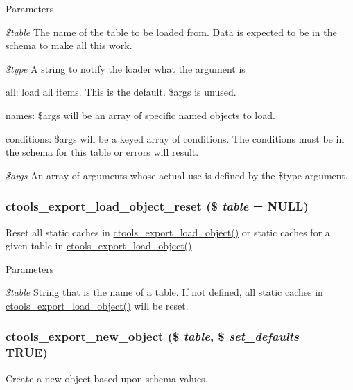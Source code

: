 \begin{DoxyParams}{Parameters}
\item[{\em \$table}]The name of the table to be loaded from. Data is expected to be in the schema to make all this work. \item[{\em \$type}]A string to notify the loader what the argument is
\begin{DoxyItemize}
\item all: load all items. This is the default. \$args is unused.
\item names: \$args will be an array of specific named objects to load.
\item conditions: \$args will be a keyed array of conditions. The conditions must be in the schema for this table or errors will result. 
\end{DoxyItemize}\item[{\em \$args}]An array of arguments whose actual use is defined by the \$type argument. \end{DoxyParams}
\hypertarget{export_8inc_ae9e981ecdb3ab89a053de44785ae0c31}{
\subsubsection[{ctools\_\-export\_\-load\_\-object\_\-reset}]{\setlength{\rightskip}{0pt plus 5cm}ctools\_\-export\_\-load\_\-object\_\-reset (\$ {\em table} = {\ttfamily NULL})}}
\label{export_8inc_ae9e981ecdb3ab89a053de44785ae0c31}
Reset all static caches in \hyperlink{export_8inc_aace7bae1172d5e4ac756fa942de06d6e}{ctools\_\-export\_\-load\_\-object()} or static caches for a given table in \hyperlink{export_8inc_aace7bae1172d5e4ac756fa942de06d6e}{ctools\_\-export\_\-load\_\-object()}.


\begin{DoxyParams}{Parameters}
\item[{\em \$table}]String that is the name of a table. If not defined, all static caches in \hyperlink{export_8inc_aace7bae1172d5e4ac756fa942de06d6e}{ctools\_\-export\_\-load\_\-object()} will be reset. \end{DoxyParams}
\hypertarget{export_8inc_a0e4261d766bcde9653e2ea04551a997a}{
\subsubsection[{ctools\_\-export\_\-new\_\-object}]{\setlength{\rightskip}{0pt plus 5cm}ctools\_\-export\_\-new\_\-object (\$ {\em table}, \/  \$ {\em set\_\-defaults} = {\ttfamily TRUE})}}
\label{export_8inc_a0e4261d766bcde9653e2ea04551a997a}
Create a new object based upon schema values.

